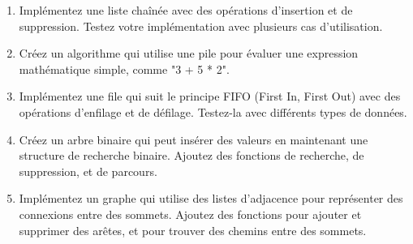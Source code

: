 \begin{enumerate}
	\item Implémentez une liste chaînée avec des opérations d'insertion et de suppression. Testez votre implémentation avec plusieurs cas d'utilisation.
	
	\item Créez un algorithme qui utilise une pile pour évaluer une expression mathématique simple, comme "3 + 5 * 2".
	
	\item Implémentez une file qui suit le principe FIFO (First In, First Out) avec des opérations d'enfilage et de défilage. Testez-la avec différents types de données.
	
	\item Créez un arbre binaire qui peut insérer des valeurs en maintenant une structure de recherche binaire. Ajoutez des fonctions de recherche, de suppression, et de parcours.
	
	\item Implémentez un graphe qui utilise des listes d'adjacence pour représenter des connexions entre des sommets. Ajoutez des fonctions pour ajouter et supprimer des arêtes, et pour trouver des chemins entre des sommets.
\end{enumerate}
